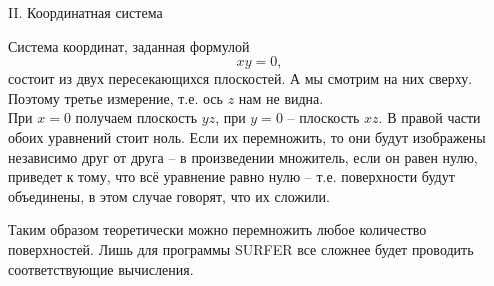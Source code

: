 \documentclass[ru]{./../../common/SurferDesc}%
\begin{document}
\footnotesize
%

\begin{surferPage}
  \begin{surferTitle}II. Координатная система\end{surferTitle}
   \begin{surferText}

   Система координат, заданная формулой \[xy=0,\] состоит из двух пересекающихся плоскостей. А мы смотрим на них сверху. Поэтому третье измерение, т.е. ось $z$ нам не видна.\\
\vspace{0.3cm}
При $x=0$ получаем плоскость $yz$, при $y=0$ -- плоскость $xz$. В правой части обоих уравнений стоит ноль. Если их перемножить, то они будут изображены независимо друг от друга – в произведении множитель, если он равен нулю, приведет к тому, что всё уравнение равно нулю – т.е. поверхности будут объединены, в этом случае говорят, что их сложили.

Таким образом теоретически можно перемножить любое количество поверхностей. Лишь для программы SURFER все сложнее будет проводить соответствующие вычисления.
\end{surferText}
\end{surferPage}
\end{document}

